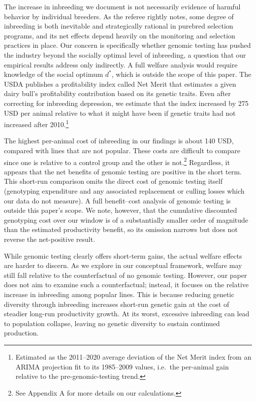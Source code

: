 \documentclass[12pt,letterpaper]{article}
\begin{document}
The increase in inbreeding we document is not necessarily evidence of harmful behavior by individual breeders. As the referee rightly notes, some degree of inbreeding is both inevitable and strategically rational in purebred selection programs, and its net effects depend heavily on the monitoring and selection practices in place. Our concern is specifically whether genomic testing has pushed the industry beyond the socially optimal level of inbreeding, a question that our empirical results address only indirectly. A full welfare analysis would require knowledge of the social optimum $d^{*}$, which is outside the scope of this paper. The USDA publishes a profitability index called Net Merit that estimates a given dairy bull's profitability contribution based on its genetic traits. Even after correcting for inbreeding depression, we estimate that the index increased by 275 USD per animal relative to what it might have been if genetic traits had not increased after 2010.\footnote{Estimated as the 2011--2020 average deviation of the Net Merit index from an ARIMA projection fit to its 1985--2009 values, i.e.\ the per-animal gain relative to the pre-genomic-testing trend.}

The highest per-animal cost of inbreeding in our findings is about 140 USD, compared with lines that are not popular. These costs are difficult to compare since one is relative to a control group and the other is not.\footnote{See Appendix A for more details on our calculations.} Regardless, it appears that the net benefits of genomic testing are positive in the short term. This short-run comparison omits the direct cost of genomic testing itself (genotyping expenditure and any associated replacement or culling losses which our data do not measure). A full benefit--cost analysis of genomic testing is outside this paper's scope. We note, however, that the cumulative discounted genotyping cost over our window is of a substantially smaller order of magnitude than the estimated productivity benefit, so its omission narrows but does not reverse the net-positive result. 

While genomic testing clearly offers short-term gains, the actual welfare effects are harder to discern. As we explore in our conceptual framework, welfare may still fall relative to the counterfactual of no genomic testing. However, our paper does not aim to examine such a counterfactual; instead, it focuses on the relative increase in inbreeding among popular lines. This is because reducing genetic diversity through inbreeding increases short-run genetic gain at the cost of steadier long-run productivity growth. At its worst, excessive inbreeding can lead to population collapse, leaving no genetic diversity to sustain continued production.
\end{document}
